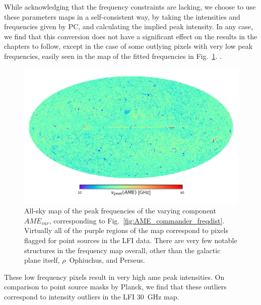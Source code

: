             While acknowledging that the frequency constraints are lacking, we choose  to use these parameters maps in a self-consistent way, by taking the intensities and frequencies given by PC, and calculating the implied peak intensity. In any case, we find that this conversion does not have a significant effect on the results in the chapters to follow, except in the case of some outlying pixels with very low peak frequencies, easily seen in the map of the fitted frequencies in Fig.~\ref{fig:PCAME_var_freq}. .
               \begin{figure}
                 \includegraphics[width=\textwidth]{../Plots/ch_datasources/PCAME_var_freq.pdf}
                 \centering
                 \caption{All-sky map of the peak frequencies of the varying component $AME_{var}$, corresponding to Fig.~\ref{fig:AME_commander_freqdist}. Virtually all of the purple regions of the map correspond to pixels flagged for point sources in the LFI data. There are very few notable structures in the frequency map overall, other than the galactic plane itself, $\rho$~Ophiuchus, and Perseus.}
                 \label{fig:PCAME_var_freq}
               \end{figure}
               These low frequency pixels result in very high \acrshort{ame} peak intensities.    On comparison to point source masks by Planck, we find that these outliers correspond to intensity outliers in the LFI 30~GHz map.

